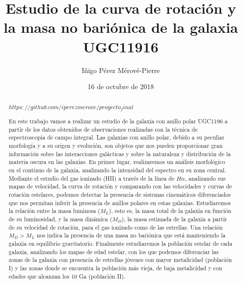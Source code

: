 \documentclass{article}
\title{Estudio de la curva de rotación y la masa no bariónica de la galaxia UGC11916}
\author{Iñigo Pérez Mérové-Pierre}
\date{16 de octubre de 2018}
\newcommand{\hal}{$H\alpha$}
\begin{document}
\maketitle

\begin{abstract}
\href{url}{$https://github.com/iperezmerove/proyecto_final$}

En este trabajo vamos a realizar un estudio de la galaxia con anillo polar UGC1196 a partir de los datos obtenidos de observaciones realizadas con la técnica de espectroscopia de campo integral. Las galaxias con anillo polar, debido a su peculiar morfología y a su origen y evolución, son objetos que nos pueden proporcionar gran información sobre las interacciones galácticas y sobre la naturaleza y distribución de la materia oscura en las galaxias. En primer lugar, realizaremos un análisis morfológico en el continuo de la galaxia, analizando la intensidad del espectro en su zona central. Mediante el estudio del gas ionizado (HII) a través de la línea de \hal, analizando sus mapas de velocidad, la curva de rotación y comparando con las velocidades y curvas de rotación estelares, podemos detectar la presencia de sistemas cinemáticos diferenciados que nos permitan inferir la presencia de anillos polares en estas galaxias. Estudiaremos la relación entre la masa luminosa ($M_{L}$), esto es, la masa total de la galaxia en función de su luminosidad, y la masa dinámica ($M_{D}$), la masa estimada de la galaxia a partir de su velocidad de rotación, para el gas ionizado como de las estrellas. Una relación $M_{D} > M_{L}$ nos indica la presencia de una masa no bariónica que está manteniendo la galaxia en equilibrio gravitatorio. Finalmente estudiaremos la población estelar de cada galaxia, analizando los mapas de edad estelar, con los que podemos diferenciar las zonas de la galaxia con presencia de estrellas jóvenes con mayor metalicidad (población I) y las zonas donde se encuentra la población más vieja, de baja metalicidad y con edades que alcanzan los 10 Ga (población II). 
\end{abstract}
\end{document}
